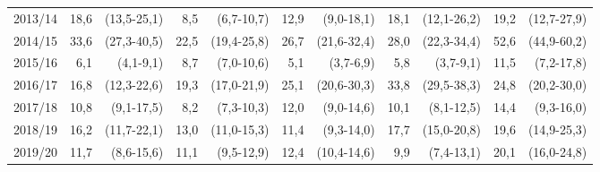 \begin{table}[H]
\begin{tabular}{c|*{4}{rr|}rr}
        2013/14 & 18,6 & (13,5-25,1) &  8,5 &  (6,7-10,7) & 12,9 &  (9,0-18,1) & 18,1 & (12,1-26,2) & 19,2 & (12,7-27,9) \\
        2014/15 & 33,6 & (27,3-40,5) & 22,5 & (19,4-25,8) & 26,7 & (21,6-32,4) & 28,0 & (22,3-34,4) & 52,6 & (44,9-60,2) \\
        2015/16 &  6,1 &   (4,1-9,1) &  8,7 &  (7,0-10,6) &  5,1 &   (3,7-6,9) &  5,8 &   (3,7-9,1) & 11,5 &  (7,2-17,8) \\
        2016/17 & 16,8 & (12,3-22,6) & 19,3 & (17,0-21,9) & 25,1 & (20,6-30,3) & 33,8 & (29,5-38,3) & 24,8 & (20,2-30,0) \\
        2017/18 & 10,8 &  (9,1-17,5) &  8,2 &  (7,3-10,3) & 12,0 &  (9,0-14,6) & 10,1 &  (8,1-12,5) & 14,4 &  (9,3-16,0) \\
        2018/19 & 16,2 & (11,7-22,1) & 13,0 & (11,0-15,3) & 11,4 &  (9,3-14,0) & 17,7 & (15,0-20,8) & 19,6 & (14,9-25,3) \\
        2019/20 & 11,7 &  (8,6-15,6) & 11,1 &  (9,5-12,9) & 12,4 & (10,4-14,6) &  9,9 &  (7,4-13,1) & 20,1 & (16,0-24,8) \\

        \bottomrule
    \end{tabular}

\end{table}
